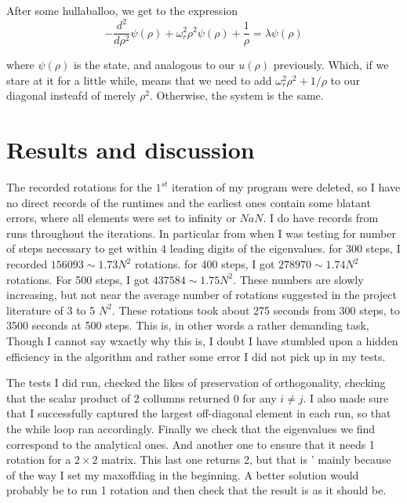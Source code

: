\documentclass[10pt, twocolumn]{article}
\begin{document}
After some hullaballoo, we get to the expression 
\begin{equation*}
  -\frac{d^2}{d\rho^2} \psi(\rho) + \omega_r^2\rho^2\psi(\rho) +\frac{1}{\rho} = \lambda \psi(\rho)
\end{equation*}

where  $\psi(\rho)$ is the state, and analogous to our $u(\rho)$ previously. Which, if we stare at it for a little
while, means that we need to add $\omega_r^2\rho^2+1/\rho$ to our diagonal insteafd of merely $\rho^2$. 
Otherwise, the system is the same. 

\section{Results and discussion}
The recorded rotations for the $1^{st}$ iteration of my program were deleted, so I have no direct records 
of the runtimes and the earliest ones contain some blatant errors, where all elements were set to infinity or 
$NaN$. I do have records from runs throughout the iterations. In particular from when I was testing for number
of steps necessary to get within 4 leading digits of the eigenvalues. for 300 steps, I recorded $156093 \sim 1.73N^2$
rotations. for 400 steps, I got $278970 \sim 1.74N^2$ rotations. For 500 steps, I got $437584 \sim 1.75N^2$. These 
numbers are slowly increasing, but not near the average number of rotations suggested in the project 
literature\cite{hjorth2000computational} of 3 to 5 $N^2$. These rotations took about  275 seconds from 300 steps, to 
3500 seconds at 500 steps. This is, in other words a rather demanding task, Though I cannot say wxactly why this is, 
I doubt I have stumbled upon a hidden efficiency in the algorithm and rather some error I did not pick up in my tests. 

The tests I did run, checked the likes of preservation of orthogonality, checking that the scalar product of 2 collumns 
returned 0 for any $i \neq j$. I also made sure that I successfully captured the largest off-diagonal element in each 
run, so that the while loop ran accordingly. Finally we check that the eigenvalues we find correspond to the analytical 
ones. And another one to ensure that it needs 1 rotation for a $2\times 2$ matrix. This last one returns 2, but that is '
mainly because of the way I set my maxoffdiag in the beginning. A better solution would probably be to run 1  rotation 
and then check that the result is as it should be. 
\end{document}
